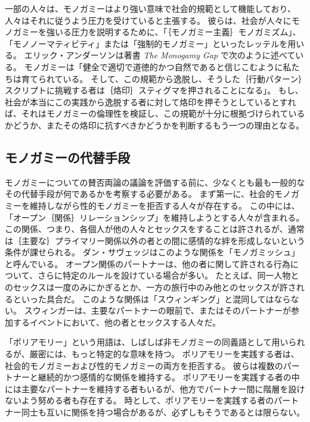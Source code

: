 \documentclass[paper=a4,book,openany]{jlreq}
\newcommand{\ig}[1]{}           %
\begin{document}
一部の人々は、モノガミーはより強い意味で社会的規範として機能しており、人々はそれに従うよう圧力を受けていると主張する。
彼らは、社会が人々にモノガミーを強いる圧力を説明するために、「｛モノガミー主義｝{モノガミズム}」、「モノノーマティビティ」または「強制的モノガミー」といったレッテルを用いる\citep[p.277]{emens04:_monog_law}。
エリック・アンダーソン\ig{Eric Anderson}は著書 \emph{The Monogamy Gap} で次のように述べている。
モノガミーは「健全で適切で道徳的かつ自然であると信じこむように私たちは育てられている。
そして、この規範から逸脱し、そうした｛行動パターン｝{スクリプト}に挑戦する者は｛烙印｝{スティグマ}を押されることになる」\citep{anderson11:_monog_gap}。
もし、社会が本当にこの実践から逸脱する者に対して烙印を押そうとしているとすれば、それはモノガミーの倫理性を検証し、この規範が十分に根拠づけられているかどうか、またその烙印に抗すべきかどうかを判断するもう一つの理由となる。

\subsection{モノガミーの代替手段}

モノガミーについての賛否両論の議論を評価する前に、少なくとも最も一般的なその代替手段が何であるかを考察する必要がある。
まず第一に、社会的モノガミーを維持しながら性的モノガミーを拒否する人々が存在する。
この中には、「オープン｛関係｝{リレーションシップ}」を維持しようとする人々が含まれる。
この関係、つまり、各個人が他の人々とセックスをすることは許されるが、通常は｛主要な｝{プライマリー}関係以外の者との間に感情的な絆を形成しないという条件が課せられる。
ダン・サヴェッジはこのような関係を「モノガミッシュ」と呼んでいる\citep{savage12:_savag_monogamish}。
オープン関係のパートナーは、他の者に関して許される行為について、さらに特定のルールを設けている場合が多い。
たとえば、同一人物とのセックスは一度のみにかぎるとか、一方の旅行中のみ他とのセックスが許されるといった具合だ。
このような関係は「スウィンギング」と混同してはならない。
スウィンガーは、主要なパートナーの眼前で、またはそのパートナーが参加するイベントにおいて、他の者とセックスする人々だ。

「ポリアモリー」という用語は、しばしば非モノガミーの同義語として用いられるが、厳密には、もっと特定的な意味を持つ。
ポリアモリーを実践する者は、社会的モノガミーおよび性的モノガミーの両方を拒否する。
彼らは複数のパートナーと継続的かつ感情的な関係を維持する。
ポリアモリーを実践する者の中には主要なパートナーを維持する者もいるが、他方でパートナー間に階層を設けないよう努める者も存在する。
時として、ポリアモリーを実践する者のパートナー同士も互いに関係を持つ場合があるが、必ずしもそうであるとは限らない。
\end{document}
